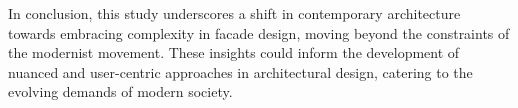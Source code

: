 



In conclusion, this study underscores a shift in contemporary architecture towards embracing complexity in facade design, moving beyond the constraints of the modernist movement.
These insights could inform the development of nuanced and user-centric approaches in architectural design, catering to the evolving demands of modern society.
